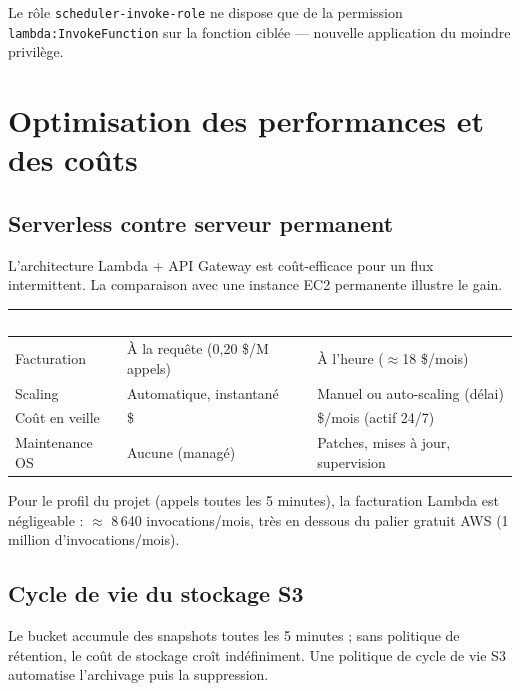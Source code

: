 \documentclass[11pt]{article}
\newcommand{\thead}[1]{\textbf{\textcolor{white}{#1}}}
\begin{document}
Le rôle \texttt{scheduler-invoke-role} ne dispose que de la permission
\texttt{lambda:InvokeFunction} sur la fonction ciblée --- nouvelle application du
moindre privilège.

\section{Optimisation des performances et des coûts}

\subsection{Serverless contre serveur permanent}

L'architecture Lambda + API Gateway est coût-efficace pour un flux intermittent. La
comparaison avec une instance EC2 permanente illustre le gain.

\begin{center}\begin{tabularx}{\linewidth}{|l|>{\raggedright\arraybackslash}X|>{\raggedright\arraybackslash}X|}
\hline
\rowcolor{tableHeader}
\thead{Critère} & \thead{Lambda + API Gateway} & \thead{EC2 t3.small} \\
\hline
Facturation & À la requête (0,20 \$/M appels) & À l'heure ($\approx$18 \$/mois) \\
\hline
Scaling & Automatique, instantané & Manuel ou auto-scaling (délai) \\
\hline
Coût en veille & 0 \$ & 18 \$/mois (actif 24/7) \\
\hline
Maintenance OS & Aucune (managé) & Patches, mises à jour, supervision \\
\hline
\end{tabularx}\end{center}

Pour le profil du projet (appels toutes les 5 minutes), la facturation Lambda est
négligeable : $\approx$ 8\,640 invocations/mois, très en dessous du palier gratuit
AWS (1 million d'invocations/mois).

\subsection{Cycle de vie du stockage S3}

Le bucket accumule des snapshots toutes les 5 minutes ; sans politique de rétention,
le coût de stockage croît indéfiniment. Une politique de cycle de vie S3 automatise
l'archivage puis la suppression.
\end{document}
